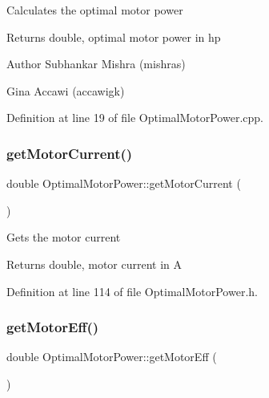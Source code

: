 Calculates the optimal motor power

\begin{DoxyReturn}{Returns}
double, optimal motor power in hp
\end{DoxyReturn}
\begin{DoxyAuthor}{Author}
Subhankar Mishra (mishras) 

Gina Accawi (accawigk) 
\end{DoxyAuthor}


Definition at line 19 of file Optimal\+Motor\+Power.\+cpp.

\mbox{\label{class_optimal_motor_power_a2c058c4320a840018a420e10272cc4dd}} 
\subsubsection{\texorpdfstring{get\+Motor\+Current()}{getMotorCurrent()}}
{\footnotesize\ttfamily double Optimal\+Motor\+Power\+::get\+Motor\+Current (\begin{DoxyParamCaption}{ }\end{DoxyParamCaption})\hspace{0.3cm}{\ttfamily [inline]}}

Gets the motor current

\begin{DoxyReturn}{Returns}
double, motor current in A 
\end{DoxyReturn}


Definition at line 114 of file Optimal\+Motor\+Power.\+h.

\mbox{\label{class_optimal_motor_power_a341fe7520227f27f9cce23f3dc4cb0cb}} 
\subsubsection{\texorpdfstring{get\+Motor\+Eff()}{getMotorEff()}}
{\footnotesize\ttfamily double Optimal\+Motor\+Power\+::get\+Motor\+Eff (\begin{DoxyParamCaption}{ }\end{DoxyParamCaption})\hspace{0.3cm}{\ttfamily [inline]}}

